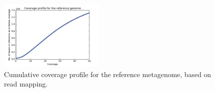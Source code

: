 \documentclass[10pt,a4paper,twocolumn]{article}
\begin{document}

 
\begin{figure}[!h]
\centering
\includegraphics[width=0.45\textwidth]{CoverageProfile.pdf}  
\caption{\label{fig:coverage-profile} Cumulative coverage profile for the reference metagenome, based on read mapping. }
\end{figure}







\end{document}
